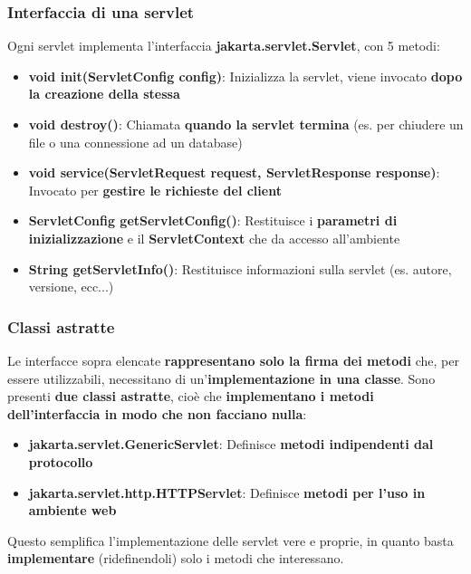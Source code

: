 \documentclass[12pt]{article}
\begin{document}
\subsubsection{Interfaccia di una servlet}
Ogni servlet implementa l'interfaccia \textbf{jakarta.servlet.Servlet}, con 5 metodi:
\begin{itemize}
    \item \textbf{void init(ServletConfig config)}: Inizializza la servlet, viene invocato \textbf{dopo la creazione della stessa}
    \item \textbf{void destroy()}: Chiamata \textbf{quando la servlet termina} (es. per chiudere un file o una connessione ad un database)
    \item \textbf{void service(ServletRequest request, ServletResponse response)}: Invocato per \textbf{gestire le richieste del client}
    \item \textbf{ServletConfig getServletConfig()}: Restituisce i \textbf{parametri di inizializzazione} e il \textbf{ServletContext} che da accesso all'ambiente
    \item \textbf{String getServletInfo()}: Restituisce informazioni sulla servlet (es. autore, versione, ecc...)
\end{itemize}
\subsubsection{Classi astratte}
Le interfacce sopra elencate \textbf{rappresentano solo la firma dei metodi} che, per essere utilizzabili, necessitano di un'\textbf{implementazione in una classe}.
Sono presenti \textbf{due classi astratte}, cioè che \textbf{implementano i metodi dell'interfaccia in modo che non facciano nulla}:
\begin{itemize}
    \item \textbf{jakarta.servlet.GenericServlet}: Definisce \textbf{metodi indipendenti dal protocollo}
    \item \textbf{jakarta.servlet.http.HTTPServlet}: Definisce \textbf{metodi per l'uso in ambiente web}
\end{itemize}
Questo semplifica l'implementazione delle servlet vere e proprie, in quanto basta \textbf{implementare} (ridefinendoli) solo i metodi che interessano.
\end{document}
